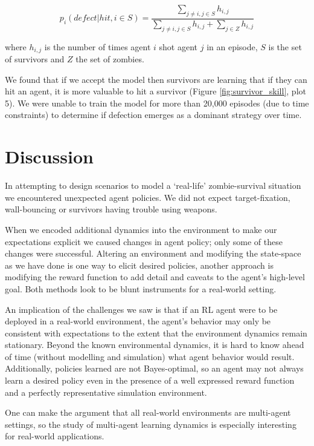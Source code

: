 \documentclass[11pt,a4paper]{article}
\begin{document}
\begin{equation}
  p_i(defect|hit, i\in S) = \frac{
    \sum\limits_{j\neq i, j\in S} h_{i,j}
  }{
    \sum\limits_{j\neq i, j\in S} h_{i,j}
    +
    \sum\limits_{j\in Z} h_{i,j}
  }
\end{equation}

where $h_{i,j}$ is the number of times agent $i$ shot agent $j$ in an episode, $S$ is the set of survivors and $Z$ the set of zombies.

We found that if we accept the model then survivors are learning that if they can hit an agent, it is more valuable to hit a survivor (Figure \ref{fig:survivor_skill}, plot 5).
We were unable to train the model for more than 20,000 episodes (due to time constraints) to determine if defection emerges as a dominant strategy over time.

\section{Discussion}
\label{sec:discussion}

In attempting to design scenarios to model a `real-life' zombie-survival situation we encountered unexpected agent policies.
We did not expect target-fixation, wall-bouncing or survivors having trouble using weapons.

When we encoded additional dynamics into the environment to make our expectations explicit we caused changes in agent policy; only some of these changes were successful.
Altering an environment and modifying the state-space as we have done is one way to elicit desired policies,
another approach is modifying the reward function to add detail and caveats to the agent's high-level goal.
Both methods look to be blunt instruments for a real-world setting.

An implication of the challenges we saw is that if an RL agent were to be deployed in a real-world environment,
the agent's behavior may only be consistent with expectations to the extent that the environment dynamics remain stationary.
Beyond the known environmental dynamics, it is hard to know ahead of time (without modelling and simulation) what agent behavior would result.
Additionally, policies learned are not Bayes-optimal, so an agent may not always learn a desired policy even in the presence of a well expressed reward function and a perfectly representative simulation environment.

One can make the argument that all real-world environments are multi-agent settings,
so the study of multi-agent learning dynamics is especially interesting for real-world applications.
\end{document}
